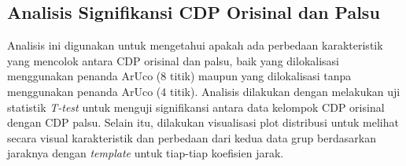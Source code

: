 
\subsection{Analisis Signifikansi CDP Orisinal dan Palsu}
Analisis ini digunakan untuk mengetahui apakah ada perbedaan karakteristik yang mencolok antara CDP orisinal dan palsu, baik yang dilokalisasi menggunakan
penanda ArUco (8 titik) maupun yang dilokalisasi tanpa menggunakan penanda ArUco (4 titik). Analisis dilakukan dengan melakukan uji statistik \emph{T-test}
untuk menguji signifikansi antara data kelompok CDP orisinal dengan CDP palsu. Selain itu, dilakukan visualisasi plot distribusi untuk melihat secara visual
karakteristik dan perbedaan dari kedua data grup berdasarkan jaraknya dengan \emph{template} untuk tiap-tiap koefisien jarak.


